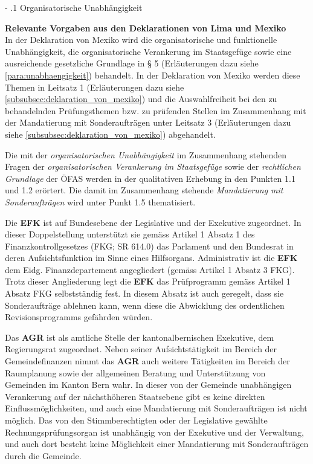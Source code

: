 \documentclass[10pt]{article}
\makeatletter
\renewcommand\paragraph{\@startsection{paragraph}{3}{0mm}{-\baselineskip}{.1\baselineskip}{\normalfont\normalsize\bfseries}}
\renewcommand\paragraph{%
\@startsection{paragraph}{3}{0mm}%
{-\baselineskip}%
{.1\baselineskip}%
{\normalfont\normalsize\bfseries}}
\makeatother
\begin{document}
\paragraph{Organisatorische Unabhängigkeit}\label{para:organisatorische_unabhaengigkeit}
\begin{shaded}
\textbf{Relevante Vorgaben aus den Deklarationen von Lima und Mexiko}\\
In der Deklaration von Mexiko wird die organisatorische und funktionelle Unabhängigkeit, die organisatorische Verankerung im Staatsgefüge sowie eine ausreichende gesetzliche Grundlage in § 5 (Erläuterungen dazu siehe \vref{para:unabhaengigkeit}) behandelt. In der Deklaration von Mexiko werden diese Themen in Leitsatz 1 (Erläuterungen dazu siehe \vref{subsubsec:deklaration_von_mexiko}) und die Auswahlfreiheit bei den zu behandelnden Prüfungsthemen bzw. zu prüfenden Stellen im Zusammenhang mit der Mandatierung mit Sonderaufträgen unter Leitsatz 3 (Erläuterungen dazu siehe \vref{subsubsec:deklaration_von_mexiko}) abgehandelt.

\end{shaded}
Die mit der \textit{organisatorischen Unabhängigkeit} im Zusammenhang stehenden Fragen der \textit{organisatorischen Verankerung im Staatsgefüge} sowie der \textit{rechtlichen Grundlage} der ÖFAS werden in der qualitativen Erhebung in den Punkten 1.1 und 1.2 erörtert. Die damit im Zusammenhang stehende \textit{Mandatierung mit Sonderaufträgen} wird unter Punkt 1.5 thematisiert.

Die \textbf{EFK} ist auf Bundesebene der Legislative und der Exekutive zugeordnet. In dieser Doppelstellung unterstützt sie gemäss Artikel 1 Absatz 1 des Finanzkontrollgesetzes (FKG; SR 614.0) das Parlament und den Bundesrat in deren Aufsichtsfunktion im Sinne eines Hilfsorgans. Administrativ ist die \textbf{EFK} dem Eidg. Finanzdepartement angegliedert (gemäss Artikel 1 Absatz 3 FKG). Trotz dieser Angliederung legt die \textbf{EFK} das Prüfprogramm gemäss Artikel 1 Absatz FKG selbstständig fest. In diesem Absatz ist auch geregelt, dass sie Sonderaufträge ablehnen kann, wenn diese die Abwicklung des ordentlichen Revisionsprogramms gefährden würden.

Das \textbf{AGR} ist als amtliche Stelle der kantonalbernischen Exekutive, dem Regierungsrat zugeordnet. Neben seiner Aufsichtstätigkeit im Bereich der Gemeindefinanzen nimmt das \textbf{AGR} auch weitere Tätigkeiten im Bereich der Raumplanung sowie der allgemeinen Beratung und Unterstützung von Gemeinden im Kanton Bern wahr. In dieser von der Gemeinde unabhängigen Verankerung auf der nächsthöheren Staatsebene gibt es keine direkten Einflussmöglichkeiten, und auch eine Mandatierung mit Sonderaufträgen ist nicht möglich. Das von den Stimmberechtigten oder der Legislative gewählte Rechnungsprüfungsorgan ist unabhängig von der Exekutive und der Verwaltung, und auch dort besteht keine Möglichkeit einer Mandatierung mit Sonderaufträgen durch die Gemeinde. 
\end{document}
